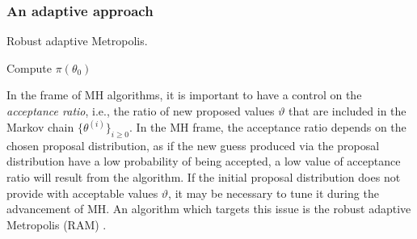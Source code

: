 \subsubsection{An adaptive approach}
\begin{algorithm}[t]
	\caption{Robust adaptive Metropolis.}
	\label{alg:RAM}
	Compute $\pi(\theta_0)$ \;
\end{algorithm}
In the frame of MH algorithms, it is important to have a control on the \textit{acceptance ratio}, i.e., the ratio of new proposed values $\vartheta$ that are included in the Markov chain $\{\theta^{(i)}\}_{i\geq 0}$. In the MH frame, the acceptance ratio depends on the chosen proposal distribution, as if the new guess produced via the proposal distribution have a low probability of being accepted, a low value of acceptance ratio will result from the algorithm. If the initial proposal distribution does not provide with acceptable values $\vartheta$, it may be necessary to tune it during the advancement of MH. An algorithm which targets this issue is the robust adaptive Metropolis (RAM) \cite{Vih12}. 

